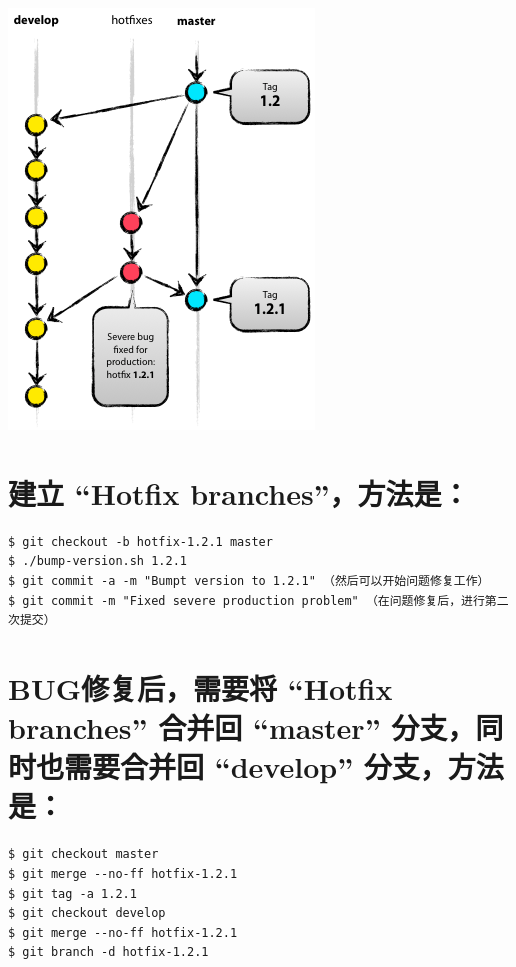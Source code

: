 \documentclass[11pt]{article}
\begin{document}
\includegraphics[width=.9\linewidth]{images/105059.png}
\section{建立 “Hotfix branches”，方法是：}
\label{sec-22}


\begin{verbatim}
$ git checkout -b hotfix-1.2.1 master
$ ./bump-version.sh 1.2.1
$ git commit -a -m "Bumpt version to 1.2.1" （然后可以开始问题修复工作）
$ git commit -m "Fixed severe production problem" （在问题修复后，进行第二次提交）
\end{verbatim}
\section{BUG修复后，需要将 “Hotfix branches” 合并回 “master” 分支，同时也需要合并回 “develop” 分支，方法是：}
\label{sec-23}


\begin{verbatim}
$ git checkout master
$ git merge --no-ff hotfix-1.2.1
$ git tag -a 1.2.1
$ git checkout develop
$ git merge --no-ff hotfix-1.2.1
$ git branch -d hotfix-1.2.1
\end{verbatim}
\end{document}
